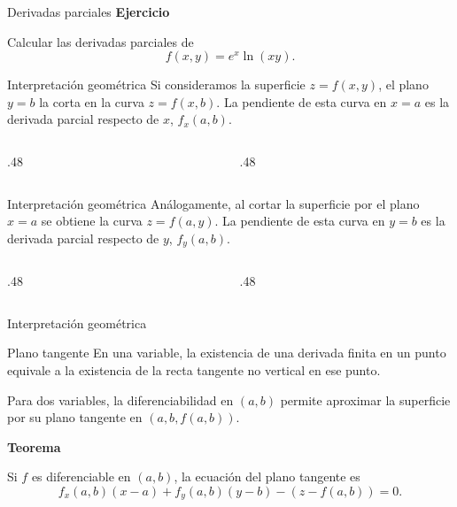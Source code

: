 \documentclass[main.tex]{subfiles}
\begin{document}
\begin{frame}{Derivadas parciales}
\textbf{Ejercicio}\par Calcular las derivadas parciales de\[f(x,y)=e^x\ln(xy).\]
\end{frame}
\begin{frame}{Interpretación geométrica}
\small Si consideramos la superficie $z=f(x,y)$, el plano $y=b$ la corta en la curva $z=f(x,b)$. La pendiente de esta curva en $x=a$ es la derivada parcial respecto de $x$, $f_x(a,b)$.
\begin{columns}[c]\begin{column}{.48\textwidth}\end{column}\begin{column}{.48\textwidth}\end{column}\end{columns}
\end{frame}
\begin{frame}{Interpretación geométrica}
\small Análogamente, al cortar la superficie por el plano $x=a$ se obtiene la curva $z=f(a,y)$. La pendiente de esta curva en $y=b$ es la derivada parcial respecto de $y$, $f_y(a,b)$.
\begin{columns}[c]\begin{column}{.48\textwidth}\end{column}\begin{column}{.48\textwidth}\end{column}\end{columns}
\end{frame}
\begin{frame}{Interpretación geométrica}
\end{frame}
\begin{frame}{Plano tangente}
\small En una variable, la existencia de una derivada finita en un punto equivale a la existencia de la recta tangente no vertical en ese punto.
\medskip

Para dos variables, la diferenciabilidad en $(a,b)$ permite aproximar la superficie por su plano tangente en $(a,b,f(a,b))$.
\medskip

\textbf{Teorema}\par Si $f$ es diferenciable en $(a,b)$, la ecuación del plano tangente es
\[f_x(a,b)(x-a)+f_y(a,b)(y-b)-(z-f(a,b))=0.\]
\end{frame}
\end{document}
